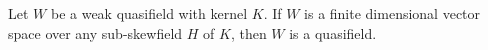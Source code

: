 Let $W$ be a weak quasifield with kernel $K$. If $W$ is a finite dimensional vector space over any sub-skewfield $H$ of $K$, then $W$ is a quasifield.
